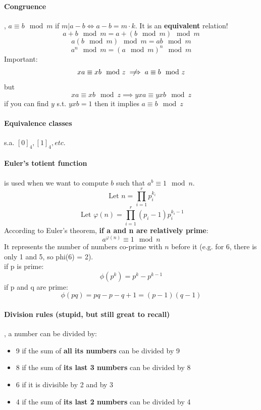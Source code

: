 \documentclass{article}
\begin{document}
\paragraph{Congruence}, $ a \equiv b \mod m $ if $ m | a - b \Leftrightarrow a - b = m \cdot k$. It is an \textbf{equivalent} relation!\\
\[ a + b \mod m = a + (b \mod m) \mod m \]
\[ a (b \mod m) \mod m = ab \mod m \]
\[ a^n \mod m = (a \mod m)^n \mod m \]
Important:
\[ xa \equiv xb \mod z \centernot\implies a \equiv b \mod z \]
but
\[ xa \equiv xb \mod z \implies yxa \equiv yxb \mod z \]
if you can find $ y $ s.t. $ yxb = 1 $ then it implies $ a \equiv b \mod z$

\paragraph{Equivalence classes} s.a. $ [0]_4, [1]_4, etc. $

\paragraph{Euler's totient function} is used when we want to compute $ b $ such that $ a^b \equiv 1 \mod{n}$.
\[ \text{ Let } n = \prod_{i = 1}^{r} p_i^{k_i}\]
\[ \text{ Let } \varphi{(n)} = \prod_{i = 1}^{r} (p_i - 1)p_i^{k_i-1} \]
According to Euler's theorem, \textbf{if a and n are relatively prime}:
\[ a^{\varphi(n)} \equiv 1 \mod{n} \]
It represents the number of numbers co-prime with $ n $ before it (e.g. for 6, there is only 1 and 5, so phi(6) = 2).\\
if p is prime:
\[ \phi(p^k) = p^k - p^{k-1} \]
if p and q are prime:
\[ \phi(pq) = pq - p - q + 1 = (p-1)(q-1) \]

\paragraph{Division rules (stupid, but still great to recall)}, a number can be divided by:
\begin{itemize}
    \item 9 if the sum of \textbf{all its numbers} can be divided by 9
    \item 8 if the sum of \textbf{its last 3 numbers} can be divided by 8
    \item 6 if it is divisible by 2 and by 3
    \item 4 if the sum of \textbf{its last 2 numbers} can be divided by 4
\end{itemize}
\end{document}
